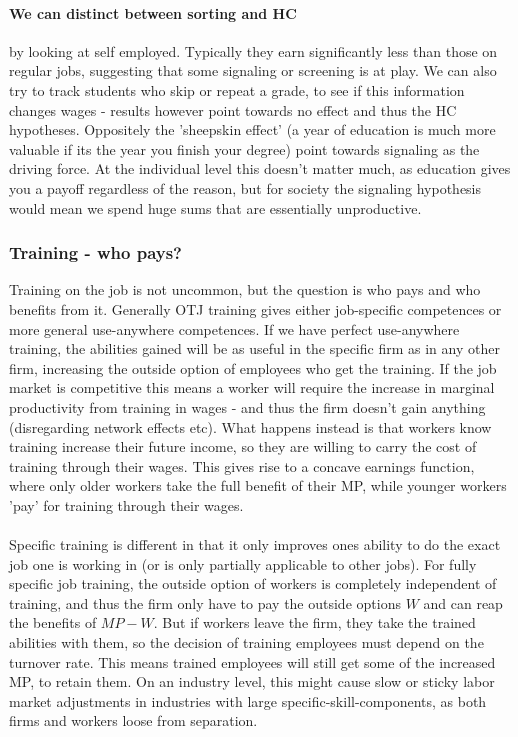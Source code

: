 \documentclass[12pt, a4paper]{article}
\begin{document}
\begin{multicols}{2}
\paragraph{We can distinct between sorting and HC} by looking at self employed. Typically they earn significantly less than those on regular jobs, suggesting that some signaling or screening is at play. We can also try to track students who skip or repeat a grade, to see if this information changes wages - results however point towards no effect and thus the HC hypotheses.
Oppositely the 'sheepskin effect' (a year of education is much more valuable if its the year you finish your degree) point towards signaling as the driving force. At the individual level this doesn't matter much, as education gives you a payoff regardless of the reason, but for society the signaling hypothesis would mean we spend huge sums that are essentially unproductive. 

\subsubsection{Training - who pays?}
Training on the job is not uncommon, but the question is who pays and who benefits from it. Generally OTJ training gives either job-specific competences or more general use-anywhere competences. If we have perfect use-anywhere training, the abilities gained will be as useful in the specific firm as in any other firm, increasing the outside option of employees who get the training. If the job market is competitive this means a worker will require the increase in marginal productivity from training in wages - and thus the firm doesn't gain anything (disregarding network effects etc). What happens instead is that workers know training increase their future income, so they are willing to carry the cost of training through their wages. This gives rise to a concave earnings function, where only older workers take the full benefit of their MP, while younger workers 'pay' for training through their wages. 
\\ \\
Specific training is different in that it only improves ones ability to do the exact job one is working in (or is only partially applicable to other jobs). For fully specific job training, the outside option of workers is completely independent of training, and thus the firm only have to pay the outside options $W$ and can reap the benefits of $MP-W$. But if workers leave the firm, they take the trained abilities with them, so the decision of training employees must depend on the turnover rate. This means trained employees will still get some of the increased MP, to retain them. On an industry level, this might cause slow or sticky labor market adjustments in industries with large specific-skill-components, as both firms and workers loose from separation. 




\end{multicols}
\end{document}
